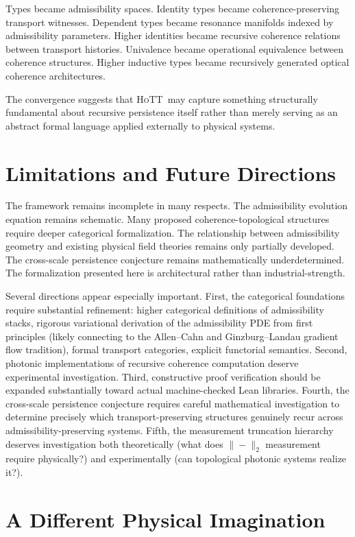 \documentclass[11pt,openany]{book}
\theoremstyle{definition}
\theoremstyle{plain}
\newcommand{\HoTT}{\textsc{HoTT}}
\begin{document}
Types became admissibility spaces. Identity types became coherence-preserving transport witnesses. Dependent types became resonance manifolds indexed by admissibility parameters. Higher identities became recursive coherence relations between transport histories. Univalence became operational equivalence between coherence structures. Higher inductive types became recursively generated optical coherence architectures.

The convergence suggests that \HoTT\ may capture something structurally fundamental about recursive persistence itself rather than merely serving as an abstract formal language applied externally to physical systems.

\section{Limitations and Future Directions}

The framework remains incomplete in many respects. The admissibility evolution equation remains schematic. Many proposed coherence-topological structures require deeper categorical formalization. The relationship between admissibility geometry and existing physical field theories remains only partially developed. The cross-scale persistence conjecture remains mathematically underdetermined. The formalization presented here is architectural rather than industrial-strength.

Several directions appear especially important. First, the categorical foundations require substantial refinement: higher categorical definitions of admissibility stacks, rigorous variational derivation of the admissibility PDE from first principles (likely connecting to the Allen--Cahn and Ginzburg--Landau gradient flow tradition), formal transport categories, explicit functorial semantics. Second, photonic implementations of recursive coherence computation deserve experimental investigation. Third, constructive proof verification should be expanded substantially toward actual machine-checked Lean libraries. Fourth, the cross-scale persistence conjecture requires careful mathematical investigation to determine precisely which transport-preserving structures genuinely recur across admissibility-preserving systems. Fifth, the measurement truncation hierarchy deserves investigation both theoretically (what does $\|-\|_2$ measurement require physically?) and experimentally (can topological photonic systems realize it?).

\section{A Different Physical Imagination}
\end{document}
